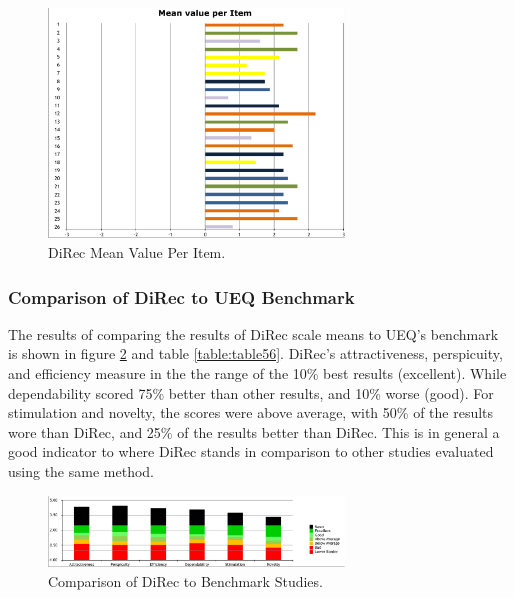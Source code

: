 \begin{figure}[!htbp]
\centering
\includegraphics[width=0.7\textwidth]{figures/direc-results3}
\caption{DiRec Mean Value Per Item.}
\label{fig:figure510}
\end{figure}


\subsubsection{Comparison of DiRec to UEQ Benchmark}
The results of comparing the results of DiRec scale means to UEQ's benchmark is
shown in figure \ref{fig:figure511} and table \ref{table:table56}. DiRec's
attractiveness, perspicuity, and efficiency measure in the the range of the 10\%
best results (excellent). While dependability scored 75\% better than other
results, and 10\% worse (good). For stimulation and novelty, the scores were
above average, with 50\% of the results wore than DiRec, and 25\% of the results
better than DiRec. This is in general a good indicator to where DiRec stands in
comparison to other studies evaluated using the same method.
\begin{figure}[!htbp]
\centering
\includegraphics[width=0.7\textwidth]{figures/direc-benchmark}
\caption{Comparison of DiRec to Benchmark Studies.}
\label{fig:figure511}
\end{figure} 


